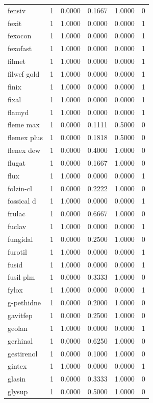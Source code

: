 \begin{longtable}{p{3.0cm}rrrrr}
fensiv & 1 & 0.0000 & 0.1667 & 1.0000 & 0 \\
fexit & 1 & 1.0000 & 0.0000 & 0.0000 & 1 \\
fexocon & 1 & 1.0000 & 0.0000 & 0.0000 & 1 \\
fexofast & 1 & 1.0000 & 0.0000 & 0.0000 & 1 \\
filmet & 1 & 1.0000 & 0.0000 & 0.0000 & 1 \\
filwef gold & 1 & 1.0000 & 0.0000 & 0.0000 & 1 \\
finix & 1 & 1.0000 & 0.0000 & 0.0000 & 1 \\
fixal & 1 & 1.0000 & 0.0000 & 0.0000 & 1 \\
flamyd & 1 & 1.0000 & 0.0000 & 0.0000 & 1 \\
fleme max & 1 & 0.0000 & 0.1111 & 0.5000 & 0 \\
flemex plus & 1 & 0.0000 & 0.1818 & 0.5000 & 0 \\
flenex dew & 1 & 0.0000 & 0.4000 & 1.0000 & 0 \\
flugat & 1 & 0.0000 & 0.1667 & 1.0000 & 0 \\
flux & 1 & 1.0000 & 0.0000 & 0.0000 & 1 \\
folzin-cl & 1 & 0.0000 & 0.2222 & 1.0000 & 0 \\
fossical d & 1 & 1.0000 & 0.0000 & 0.0000 & 1 \\
frulac & 1 & 0.0000 & 0.6667 & 1.0000 & 0 \\
fuclav & 1 & 1.0000 & 0.0000 & 0.0000 & 1 \\
fungidal & 1 & 0.0000 & 0.2500 & 1.0000 & 0 \\
furotil & 1 & 1.0000 & 0.0000 & 0.0000 & 1 \\
fusid & 1 & 1.0000 & 0.0000 & 0.0000 & 1 \\
fusil plm & 1 & 0.0000 & 0.3333 & 1.0000 & 0 \\
fylox & 1 & 1.0000 & 0.0000 & 0.0000 & 1 \\
g-pethidne & 1 & 0.0000 & 0.2000 & 1.0000 & 0 \\
gavitfep & 1 & 0.0000 & 0.2500 & 1.0000 & 0 \\
geolan & 1 & 1.0000 & 0.0000 & 0.0000 & 1 \\
gerhinal & 1 & 0.0000 & 0.6250 & 1.0000 & 0 \\
gestirenol & 1 & 0.0000 & 0.1000 & 1.0000 & 0 \\
gintex & 1 & 1.0000 & 0.0000 & 0.0000 & 1 \\
glasin & 1 & 0.0000 & 0.3333 & 1.0000 & 0 \\
glysup & 1 & 0.0000 & 0.5000 & 1.0000 & 0 \\

\end{longtable}
